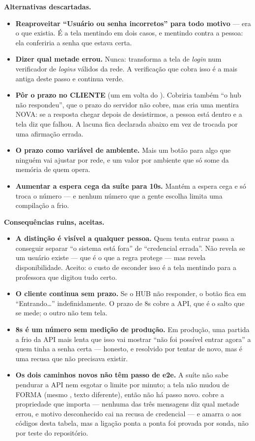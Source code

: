 \textbf{Alternativas descartadas.}
\begin{itemize}
  \item \textbf{Reaproveitar \enquote{Usuário ou senha incorretos} para todo
    motivo} --- era o que existia. É a tela mentindo em dois casos, e mentindo
    contra a pessoa: ela conferiria a senha que estava certa.
  \item \textbf{Dizer qual metade errou.} Nunca: transforma a tela de
    \emph{login} num verificador de \emph{logins} válidos da rede. A
    verificação que cobra isso é a mais antiga deste passo e continua verde.
  \item \textbf{Pôr o prazo no CLIENTE} (um  em volta do
    ). Cobriria também \enquote{o hub não respondeu}, que o prazo do
    servidor não cobre, mas cria uma mentira NOVA: se a resposta chegar depois
    de desistirmos, a pessoa está dentro e a tela diz que falhou. A lacuna fica
    declarada abaixo em vez de trocada por uma afirmação errada.
  \item \textbf{O prazo como variável de ambiente.} Mais um botão para algo que
    ninguém vai ajustar por rede, e um valor por ambiente que só some da
    memória de quem opera.
  \item \textbf{Aumentar a espera cega da suíte para 10s.} Mantém a espera
    cega e só troca o número --- e nenhum número que a gente escolha limita uma
    compilação a frio.
\end{itemize}

\textbf{Consequências ruins, aceitas.}
\begin{itemize}
  \item \textbf{A distinção é visível a qualquer pessoa.} Quem tenta entrar
    passa a conseguir separar \enquote{o sistema está fora} de
    \enquote{credencial errada}. Não revela se um usuário existe --- que é o
    que a regra protege --- mas revela disponibilidade. Aceito: o custo de
    esconder isso é a tela mentindo para a professora que digitou tudo certo.
  \item \textbf{O cliente continua sem prazo.} Se o HUB não responder, o botão
    fica em \enquote{Entrando\ldots} indefinidamente. O prazo de 8s cobre a
    API, que é o salto que se mede; o outro não tem tela.
  \item \textbf{8s é um número sem medição de produção.} Em produção, uma
    partida a frio da API mais lenta que isso vai mostrar \enquote{não foi
    possível entrar agora} a quem tinha a senha certa --- honesto, e resolvido
    por tentar de novo, mas é uma recusa que não precisava existir.
  \item \textbf{Os dois caminhos novos não têm passo de e2e.} A suíte não sabe
    pendurar a API nem esgotar o limite por minuto; a tela não mudou de FORMA
    (mesmo , texto diferente), então não há passo novo.
     cobre a propriedade que
    importa --- nenhuma das três mensagens diz qual metade errou, e motivo
    desconhecido cai na recusa de credencial --- e amarra o  aos
    códigos desta tabela, mas a ligação ponta a ponta foi provada por sonda, não
    por teste do repositório.
\end{itemize}

